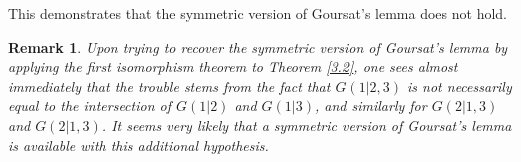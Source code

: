 \documentclass[11pt]{article}
\theoremstyle{change}
\newtheorem{Rem}[Thm]{Remark}
\newcommand{\<}{\langle}
\renewcommand{\>}{\rangle}
\begin{document}
This demonstrates that the symmetric version of Goursat's lemma does not hold.

\begin{Rem} Upon trying to recover the symmetric version of Goursat's lemma by applying the first isomorphism theorem to Theorem \ref{3.2}, one sees almost immediately that the trouble stems from the fact that $G(1|2,3)$ is not necessarily equal to the intersection of $G(1|2)$ and $G(1|3)$, and similarly for $G(2|1,3)$ and $G(2|1,3)$.  It seems very likely that a symmetric version of Goursat's lemma is available with this additional hypothesis.
\end{Rem}
\end{document}
